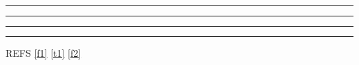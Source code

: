 \documentclass{article}
\begin{document}
\listoffigures
\noindent\begin{minipage}{.45\linewidth}
\centering\rule{2cm}{1cm}
\label{f1}
\end{minipage}\hfill
\begin{minipage}{.45\linewidth}
\centering\rule{2cm}{1cm}
\label{t1}
\end{minipage}

\bigskip
\noindent\begin{minipage}{.45\linewidth}
\captionsetup{type=figure}
\centering\rule{2cm}{1cm}
\caption{Figure by type=figure}\label{f2}
\end{minipage}\hfill
\begin{minipage}{.45\linewidth}
\centering\rule{2cm}{1cm}
\end{minipage}

REFS \ref{f1} \ref{t1} \ref{f2}
\end{document}
